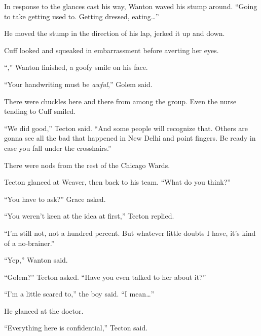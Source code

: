 In response to the glances cast his way, Wanton waved his stump around.  ``Going to take getting used to.  Getting dressed, eating\ldots''



He moved the stump in the direction of his lap, jerked it up and down.



Cuff looked and squeaked in embarrassment before averting her eyes.



``\ldotswriting,'' Wanton finished, a goofy smile on his face.



``Your handwriting must be \emph{awful},'' Golem said.



There were chuckles here and there from among the group.  Even the nurse tending to Cuff smiled.



``We did good,'' Tecton said.  ``And some people will recognize that.  Others are gonna see all the bad that happened in New Delhi and point fingers.  Be ready in case you fall under the crosshairs.''



There were nods from the rest of the Chicago Wards.



Tecton glanced at Weaver, then back to his team.  ``What do you think?''



``You have to ask?'' Grace asked.



``You weren't keen at the idea at first,'' Tecton replied.



``I'm still not, not a hundred percent.  But whatever little doubts I have, it's kind of a no-brainer.''



``Yep,'' Wanton said.



``Golem?''  Tecton asked.  ``Have you even talked to her about it?''



``I'm a little scared to,'' the boy said.  ``I mean\ldots''



He glanced at the doctor.



``Everything here is confidential,'' Tecton said.



